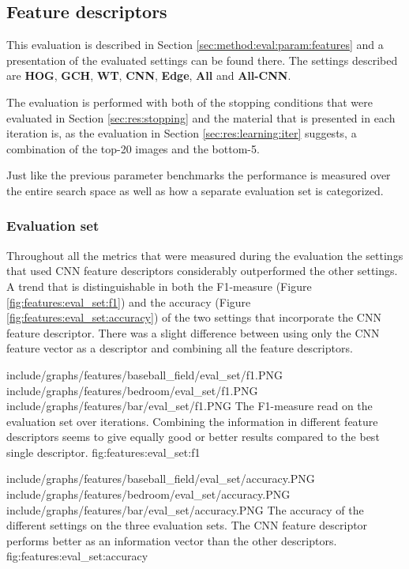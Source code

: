
\subsection{Feature descriptors}
\label{sec:res:features}
This evaluation is described in Section \ref{sec:method:eval:param:features} and a presentation of the evaluated settings can be found there. The settings described are \textbf{HOG}, \textbf{GCH}, \textbf{WT}, \textbf{CNN}, \textbf{Edge}, \textbf{All} and \textbf{All-CNN}.

The evaluation is performed with both of the stopping conditions that were evaluated in Section \ref{sec:res:stopping} and the material that is presented in each iteration is, as the evaluation in Section \ref{sec:res:learning:iter} suggests, a combination of the top-20 images and the bottom-5. 

Just like the previous parameter benchmarks the performance is measured over the entire search space as well as how a separate evaluation set is categorized.

\subsubsection{Evaluation set}
\label{sec:res:features:eval}


Throughout all the metrics that were measured during the evaluation the settings that used CNN feature descriptors considerably outperformed the other settings.  A trend that is distinguishable in both the F1-measure (Figure \ref{fig:features:eval_set:f1}) and the accuracy (Figure \ref{fig:features:eval_set:accuracy}) of the two settings that incorporate the CNN feature descriptor. There was a slight difference between using only the CNN feature vector as a descriptor and combining all the feature descriptors.

\tripfigurenear
{include/graphs/features/baseball_field/eval_set/f1.PNG}
{include/graphs/features/bedroom/eval_set/f1.PNG}
{include/graphs/features/bar/eval_set/f1.PNG}
{The F1-measure read on the evaluation set over iterations. Combining the information in different feature descriptors seems to give equally good or better results compared to the best single descriptor.}
{fig:features:eval_set:f1}

\tripfigurenear
{include/graphs/features/baseball_field/eval_set/accuracy.PNG}
{include/graphs/features/bedroom/eval_set/accuracy.PNG}
{include/graphs/features/bar/eval_set/accuracy.PNG}
{The accuracy of the different settings on the three evaluation sets. The CNN feature descriptor performs better as an information vector than the other descriptors.}
{fig:features:eval_set:accuracy}

